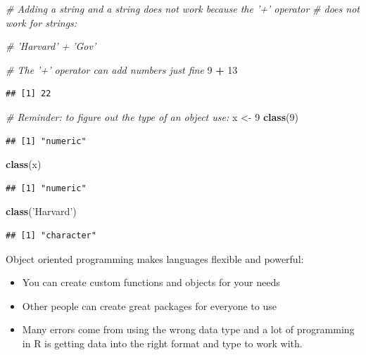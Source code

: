 \documentclass[]{book}
\newenvironment{Shaded}{\begin{snugshade}}{\end{snugshade}}
\newcommand{\KeywordTok}[1]{\textcolor[rgb]{0.13,0.29,0.53}{\textbf{#1}}}
\newcommand{\DecValTok}[1]{\textcolor[rgb]{0.00,0.00,0.81}{#1}}
\newcommand{\StringTok}[1]{\textcolor[rgb]{0.31,0.60,0.02}{#1}}
\newcommand{\CommentTok}[1]{\textcolor[rgb]{0.56,0.35,0.01}{\textit{#1}}}
\newcommand{\OperatorTok}[1]{\textcolor[rgb]{0.81,0.36,0.00}{\textbf{#1}}}
\newcommand{\NormalTok}[1]{#1}
\providecommand{\tightlist}{%
  \setlength{\itemsep}{0pt}\setlength{\parskip}{0pt}}
\theoremstyle{definition}
\theoremstyle{definition}
\theoremstyle{definition}
\theoremstyle{remark}
\begin{document}
\begin{Shaded}
\begin{Highlighting}[]
\CommentTok{# Adding a string and a string does not work because the '+' operator }
\CommentTok{# does not work for strings:}

\CommentTok{# 'Harvard' + 'Gov'}

\CommentTok{# The '+' operator can add numbers just fine}
\DecValTok{9} \OperatorTok{+}\StringTok{ }\DecValTok{13}
\end{Highlighting}
\end{Shaded}

\begin{verbatim}
## [1] 22
\end{verbatim}

\begin{Shaded}
\begin{Highlighting}[]
\CommentTok{# Reminder: to figure out the type of an object use:}
\NormalTok{x <-}\StringTok{ }\DecValTok{9}
\KeywordTok{class}\NormalTok{(}\DecValTok{9}\NormalTok{)}
\end{Highlighting}
\end{Shaded}

\begin{verbatim}
## [1] "numeric"
\end{verbatim}

\begin{Shaded}
\begin{Highlighting}[]
\KeywordTok{class}\NormalTok{(x)}
\end{Highlighting}
\end{Shaded}

\begin{verbatim}
## [1] "numeric"
\end{verbatim}

\begin{Shaded}
\begin{Highlighting}[]
\KeywordTok{class}\NormalTok{(}\StringTok{'Harvard'}\NormalTok{)}
\end{Highlighting}
\end{Shaded}

\begin{verbatim}
## [1] "character"
\end{verbatim}

Object oriented programming makes languages flexible and powerful:

\begin{itemize}
\tightlist
\item
  You can create custom functions and objects for your needs
\item
  Other people can create great packages for everyone to use
\item
  Many errors come from using the wrong data type and a lot of
  programming in R is getting data into the right format and type to
  work with.
\end{itemize}
\end{document}
